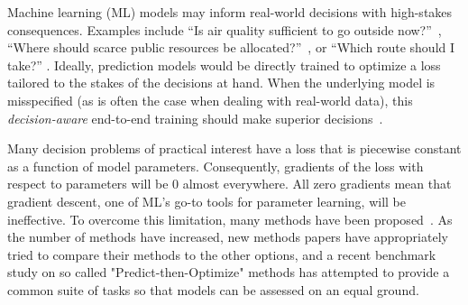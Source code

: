 Machine learning (ML) models may inform real-world decisions with high-stakes consequences. Examples include 
``Is air quality sufficient to go outside now?''~\citep{berlinghieri2026hourly},
``Where should scarce public resources be allocated?''~\citep{heuton2025decisionaware},  or ``Which route should I take?'' \citep{tangPyEPOPyTorchbasedEndtoend2024}. 
Ideally, prediction models would be directly trained to optimize a loss tailored to the stakes of the decisions at hand. When the underlying model is misspecified (as is often the case when dealing with real-world data), this \emph{decision-aware} end-to-end training should make superior decisions~\citep{elmachtoubDissectingImpactModel2025}. 


Many decision problems of practical interest have a loss that is piecewise constant as a function of model parameters. Consequently, gradients of the loss with respect to parameters will be 0 almost everywhere. 
All zero gradients mean that gradient descent, one of ML's go-to tools for parameter learning, will be ineffective. 
To overcome this limitation, many methods have been proposed~\citep{mandi_decision-focused_2024}. 
As the number of methods have increased, new methods papers have appropriately tried to compare their methods to the other options, and a recent benchmark study on so called "Predict-then-Optimize" methods \citep{gengBenchmarkingPtOPnO2024} has attempted to provide a common suite of tasks so that models can be assessed on an equal ground.


